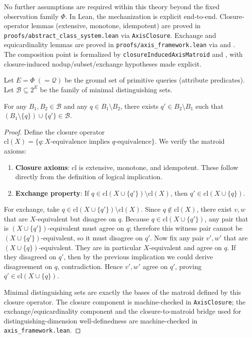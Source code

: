 No further assumptions are required within this theory beyond the fixed observation family $\Phi$. In Lean, the mechanization is explicit end-to-end. Closure-operator lemmas (extensive, monotone, idempotent) are proved in \nolinkurl{proofs/abstract_class_system.lean} via \nolinkurl{AxisClosure}. Exchange and equicardinality lemmas are proved in \nolinkurl{proofs/axis_framework.lean} via  and . The composition point is formalized by \nolinkurl{closureInducedAxisMatroid} and , with closure-induced nodup/subset/exchange hypotheses made explicit.

\begin{definition}
Let $E = \Phi\;(=\mathcal{Q})$ be the ground set of primitive queries (attribute predicates). Let $\mathcal{B} \subseteq 2^E$ be the family of minimal distinguishing sets.
\end{definition}

\begin{lemma}\label{lem:basis-exchange}
For any $B_1, B_2 \in \mathcal{B}$ and any $q \in B_1 \setminus B_2$, there exists $q' \in B_2 \setminus B_1$ such that $(B_1 \setminus \{q\}) \cup \{q'\} \in \mathcal{B}$.
\end{lemma}

\begin{proof}
Define the closure operator $\text{cl}(X) = \{q : X\text{-equivalence implies }q\text{-equivalence}\}$. We verify the matroid axioms:
\begin{enumerate}
\item \textbf{Closure axioms}: $\text{cl}$ is extensive, monotone, and idempotent. These follow directly from the definition of logical implication.
\item \textbf{Exchange property}: If $q \in \text{cl}(X \cup \{q'\}) \setminus \text{cl}(X)$, then $q' \in \text{cl}(X \cup \{q\})$.
\end{enumerate}

For exchange, take $q \in \text{cl}(X \cup \{q'\}) \setminus \text{cl}(X)$. Since $q \notin \text{cl}(X)$, there exist $v,w$ that are $X$-equivalent but disagree on $q$. Because $q \in \text{cl}(X \cup \{q'\})$, any pair that is $(X \cup \{q'\})$-equivalent must agree on $q$; therefore this witness pair cannot be $(X \cup \{q'\})$-equivalent, so it must disagree on $q'$. Now fix any pair $v',w'$ that are $(X \cup \{q\})$-equivalent. They are in particular $X$-equivalent and agree on $q$. If they disagreed on $q'$, then by the previous implication we could derive disagreement on $q$, contradiction. Hence $v',w'$ agree on $q'$, proving $q' \in \text{cl}(X \cup \{q\})$.

Minimal distinguishing sets are exactly the bases of the matroid defined by this closure operator. The closure component is machine-checked in \texttt{AxisClosure}; the exchange/equicardinality component and the closure-to-matroid bridge used for distinguishing-dimension well-definedness are machine-checked in \texttt{axis\_framework.lean}.
\end{proof}

